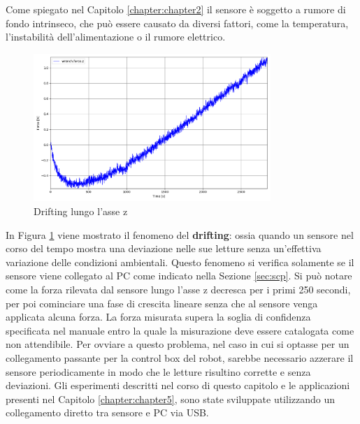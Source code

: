 Come spiegato nel Capitolo \ref{chapter:chapter2} il sensore \`{e} soggetto a rumore di fondo intrinseco, che 
pu\`{o} essere causato da diversi fattori, come la temperatura, l'instabilit\`{a} dell'alimentazione o il rumore elettrico. 
\newpage
\begin{figure}[H]
    \centering
    \includegraphics*[width=0.80\textwidth]{images/drifting.png}
    \caption{Drifting lungo l'asse z}
    \label{fig:drifting}
\end{figure}
In Figura \ref{fig:drifting} viene mostrato il fenomeno del \textbf{drifting}: ossia quando un sensore nel corso del tempo 
mostra una deviazione nelle sue letture senza un'effettiva variazione delle condizioni ambientali. Questo fenomeno si verifica 
solamente se il sensore viene collegato al PC come indicato nella Sezione \ref{sec:scp}. 
Si pu\`{o} notare come la forza rilevata dal sensore lungo l'asse z decresca per i primi 250 secondi, per poi 
cominciare una fase di crescita lineare senza che al sensore venga applicata alcuna forza. 
La forza misurata supera la soglia di confidenza specificata nel manuale entro la 
quale la misurazione deve essere catalogata come non attendibile. 
Per ovviare a questo problema, nel caso in cui si optasse per un collegamento passante per la control box del robot, 
sarebbe necessario azzerare il sensore periodicamente in modo che le letture risultino corrette e senza deviazioni. 
Gli esperimenti descritti nel corso di questo capitolo e le applicazioni presenti nel Capitolo \ref{chapter:chapter5}, sono state 
sviluppate utilizzando un collegamento diretto tra sensore e PC via USB.
